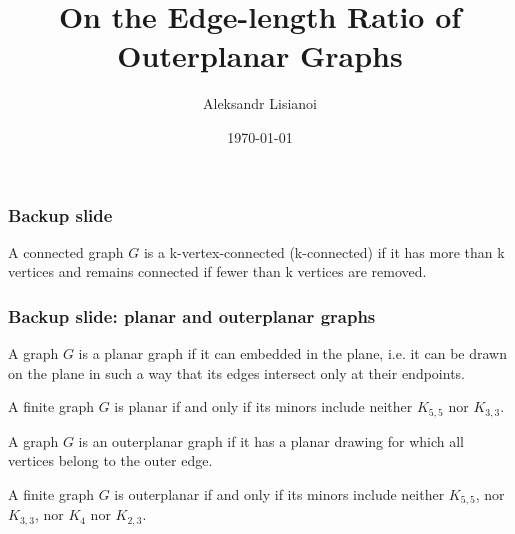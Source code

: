 \documentclass[xetex,mathserif,serif]{beamer}
\title{On the Edge-length Ratio of Outerplanar Graphs}
\author{Aleksandr Lisianoi}
\institute{Technische Universität Wien}
\date{\today}
\begin{document}
  \maketitle

  \begin{frame}
    \frametitle{Backup slide}

    \begin{definition}
      A connected graph \(G\) is a k-vertex-connected (k-connected) if it has more than k vertices and remains connected if fewer than k vertices are removed.
    \end{definition}
  \end{frame}

  \begin{frame}
    \frametitle{Backup slide: planar and outerplanar graphs}

    \begin{definition}
      A graph \(G\) is a planar graph if it can embedded in the plane, i.e. it can be drawn on the plane in such a way that its edges intersect only at their endpoints.
    \end{definition}

    \begin{definition}
      A finite graph \(G\) is planar if and only if its minors include neither \(K_{5,5}\) nor \(K_{3, 3}\).
    \end{definition}

    \begin{definition}
      A graph \(G\) is an outerplanar graph if it has a planar drawing for which all vertices belong to the outer edge.
    \end{definition}

    \begin{definition}
      A finite graph \(G\) is outerplanar if and only if its minors include neither \(K_{5, 5}\), nor \(K_{3, 3}\), nor \(K_4\) nor \(K_{2, 3}\).
    \end{definition}
  \end{frame}
\end{document}
